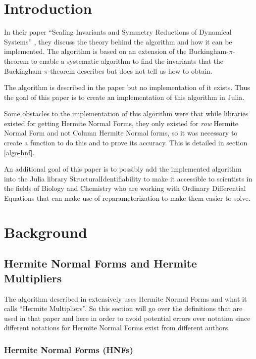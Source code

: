 \documentclass[oneside, a4paper, onecolumn, 11pt]{article}
\begin{document}
\newpage

\section{Introduction}

In their paper ``Scaling Invariants and Symmetry Reductions of Dynamical Systems'' \cite{Hubert2013}, they discuss the theory behind the algorithm and how it can be implemented. The algorithm is based on an extension of the Buckingham-\(\pi\)-theorem to enable a systematic algorithm to find the invariants that the Buckingham-\(\pi\)-theorem describes but does not tell us how to obtain.

The algorithm is described in the paper but no implementation of it exists. Thus the goal of this paper is to create an implementation of this algorithm in Julia.

Some obstacles to the implementation of this algorithm were that while libraries existed for getting Hermite Normal Forms, they only existed for \textit{row} Hermite Normal Form and not Column Hermite Normal forms, so it was necessary to create a function to do this and to prove its accuracy. This is detailed in section \ref{algo-hnf}.

An additional goal of this paper is to possibly add the implemented algorithm into the Julia library StructuralIdentifiability \cite{structidjl} to make it accessible to scientists in the fields of Biology and Chemistry who are working with Ordinary Differential Equations that can make use of reparameterization to make them easier to solve.

\section{Background}

\subsection{Hermite Normal Forms and Hermite Multipliers}

The algorithm described in \cite{Hubert2013} extensively uses Hermite Normal Forms and what it calls ``Hermite Multipliers''. So this section will go over the definitions that are used in that paper and here in order to avoid potential errors over notation since different notations for Hermite Normal Forms exist from different authors.

\subsubsection{Hermite Normal Forms (HNFs)}
\end{document}
